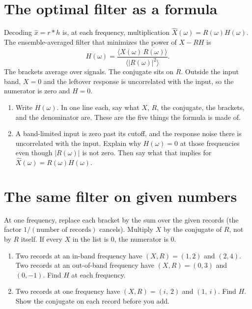 \documentclass[11pt,letterpaper]{article}
\begin{document}
\section{The optimal filter as a formula}

\begin{idea}
Decoding $\hat{x} = r * h$ is, at each frequency, multiplication $\hat{X}(\omega) = R(\omega) H(\omega)$. The ensemble-averaged filter that minimizes the power of $X - RH$ is
\[
H(\omega) = \frac{\langle X(\omega)\,\overline{R(\omega)}\rangle}{\langle |R(\omega)|^2 \rangle}.
\]
The brackets average over signals. The conjugate sits on $R$. Outside the input band, $X = 0$ and the leftover response is uncorrelated with the input, so the numerator is zero and $H = 0$.
\end{idea}

\begin{enumerate}
\item Write $H(\omega)$. In one line each, say what $X$, $R$, the conjugate, the brackets, and the denominator are. These are the five things the formula is made of.
\item A band-limited input is zero past its cutoff, and the response noise there is uncorrelated with the input. Explain why $H(\omega) = 0$ at those frequencies even though $|R(\omega)|$ is not zero. Then say what that implies for $\hat{X}(\omega) = R(\omega)H(\omega)$.
\end{enumerate}

\section{The same filter on given numbers}

\begin{idea}
At one frequency, replace each bracket by the sum over the given records (the factor $1/(\text{number of records})$ cancels). Multiply $X$ by the conjugate of $R$, not by $R$ itself. If every $X$ in the list is $0$, the numerator is $0$.
\end{idea}

\begin{enumerate}
\item Two records at an in-band frequency have $(X, R) = (1, 2)$ and $(2, 4)$. Two records at an out-of-band frequency have $(X, R) = (0, 3)$ and $(0, -1)$. Find $H$ at each frequency.
\item Two records at one frequency have $(X, R) = (i,\ 2)$ and $(1,\ i)$. Find $H$. Show the conjugate on each record before you add.
\end{enumerate}
\end{document}

